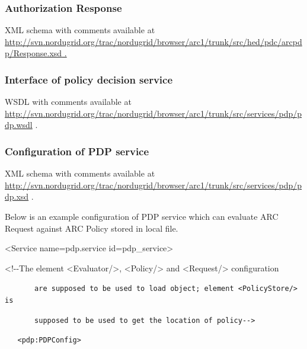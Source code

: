 \documentclass{article}
\newcommand\textstyleInternetlink[1]{\textcolor[rgb]{0.0,0.0,0.5019608}{#1}}
\begin{document}
\subsubsection{Authorization Response}
{\upshape\color{black}
XML schema with comments available at
\href{http://svn.nordugrid.org/trac/nordugrid/browser/arc1/trunk/src/hed/pdc/arcpdp/Request.xsd}{\textstyleInternetlink{http://svn.nordugrid.org/trac/nordugrid/browser/arc1/trunk/src/hed/pdc/arcpdp/Response.xsd}}\href{http://svn.nordugrid.org/trac/nordugrid/browser/arc1/trunk/src/hed/pdc/arcpdp/Policy.xsd}{\textstyleInternetlink{
.}}}

\subsubsection[Interface of policy decision service]{Interface of policy
decision service}
{\upshape\color{black}
WSDL with comments available at
\url{http://svn.nordugrid.org/trac/nordugrid/browser/arc1/trunk/src/services/pdp/pdp.wsdl}
.}

\subsubsection{Configuration of PDP service}
{\upshape\color{black}
XML schema with comments available at
\url{http://svn.nordugrid.org/trac/nordugrid/browser/arc1/trunk/src/services/pdp/pdp.xsd}
.}

{\upshape\color{black}
Below is an example configuration of PDP service which can evaluate ARC
Request against ARC Policy stored in local file.}

{\ttfamily\color{black}
{\textless}Service name={\textquotedbl}pdp.service{\textquotedbl}
id={\textquotedbl}pdp\_service{\textquotedbl}{\textgreater}}

{\ttfamily\color{black}
{\textless}!-{}-The element {\textless}Evaluator/{\textgreater},
{\textless}Policy/{\textgreater} and {\textless}Request/{\textgreater}
configuration}

{\upshape\color{black}
\texttt{\ \ \ \ \ \ \ are supposed to be used to load object; element
{\textless}PolicyStore/{\textgreater} is}}

{\upshape\color{black}
\texttt{\ \ \ \ \ \ \ supposed to be used to get the location of
policy-{}-{\textgreater}}}

{\upshape\color{black}
\texttt{\ \ \ {\textless}pdp:PDPConfig{\textgreater}}}
\end{document}
